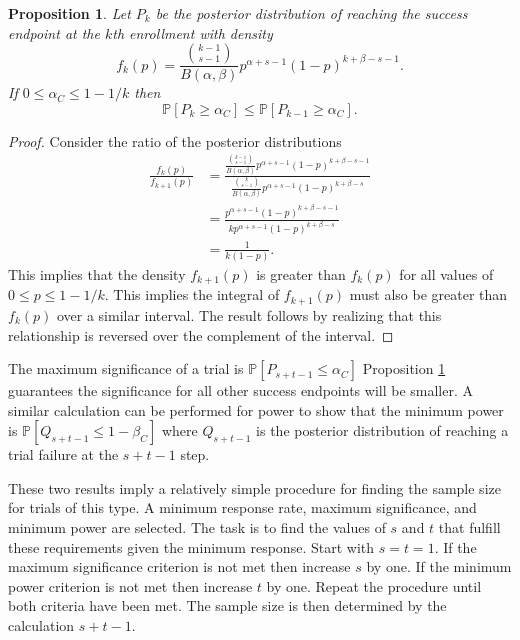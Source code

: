 \documentclass[12pt]{article}
\newtheorem{prop}{Proposition}
\begin{document}
\begin{prop} \label{alpha_c}
Let $P_k$ be the posterior distribution of reaching the success endpoint
at the $k$th enrollment with density
\begin{equation*}
f_k(p) = \frac{ {k-1 \choose s-1} }{B(\alpha, \beta)} p^{\alpha +s -1} 
    (1-p)^{k+\beta-s-1}.
\end{equation*}
If $0 \leq \alpha_C \leq 1 - 1/k$ then 
\begin{equation}
\mathbb{P} \left[P_k \geq \alpha_C \right]  \leq
  \mathbb{P} \left[P_{k-1} \geq \alpha_C \right].
\end{equation}
\end{prop}
\begin{proof}
Consider the ratio of the posterior distributions
\begin{align*}
\frac{f_k(p)}{f_{k+1}(p)} &= 
  \frac{\frac{ {k-1 \choose s-1} }{B(\alpha, \beta)} p^{\alpha +s -1} 
    (1-p)^{k+\beta-s-1}}
    {\frac{ {k \choose s-1} }{B(\alpha, \beta)} p^{\alpha +s -1} 
    (1-p)^{k+\beta-s}} \\
  &= \frac{ p^{\alpha +s -1} (1-p)^{k+\beta-s-1} }
    {k p^{\alpha +s -1} (1-p)^{k+\beta-s}} \\
  &= \frac{1}{k(1-p)}.
\end{align*}
This implies that the density $f_{k+1}(p)$ is greater than $f_k(p)$ for
all values of $0 \leq p \leq 1 - 1/k$. This implies the
integral of $f_{k+1}(p)$ must also be greater than $f_k(p)$ over a similar
interval. The result follows by realizing that this relationship is reversed
over the complement of the interval.
\end{proof}

The maximum significance of a trial is 
$\mathbb{P} \left[P_{s+t-1} \leq \alpha_C \right]$ Proposition \ref{alpha_c}
guarantees the significance for all other success endpoints will be smaller.
A similar calculation can be performed for power to show that the minimum
power is $\mathbb{P} \left[Q_{s+t-1} \leq 1 - \beta_C \right]$ where
$Q_{s+t-1}$ is the posterior distribution of reaching a trial failure
at the $s+t-1$ step.

These two results imply a relatively simple procedure for finding the sample
size for trials of this type. A minimum response rate, maximum significance,
and minimum power are selected. The task is to find the values of $s$ and
$t$ that fulfill these requirements given the minimum response. Start with 
$s = t = 1$. If the maximum significance criterion is not met then increase
$s$ by one. If the minimum power criterion is not met then increase $t$ by
one. Repeat the procedure until both criteria have been met. The sample
size is then determined by the calculation $s+t-1$.
\end{document}

